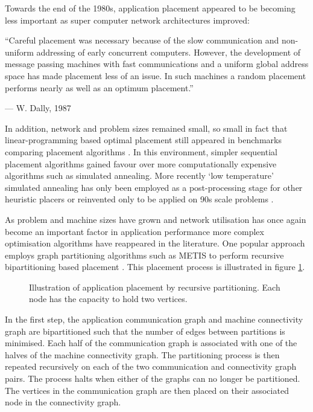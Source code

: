 				Towards the end of the 1980s, application placement appeared to be
				becoming less important as super computer network architectures
				improved:
				\begin{displayquote}
					``Careful placement was necessary because of the slow communication
					and non-uniform addressing of early concurrent computers. However,
					the development of message passing machines with fast communications
					and a uniform global address space  has made placement less of an
					issue. In such machines a random placement performs nearly as well as
					an optimum placement.''
					
					\noindent --- W. Dally, 1987 \cite{dally87}
				\end{displayquote}
				In addition, network and problem sizes remained small, so small in fact
				that linear-programming based optimal placement still appeared in
				benchmarks comparing placement algorithms \cite{xu91}. In this
				environment, simpler sequential placement algorithms gained favour over
				more computationally expensive algorithms such as simulated annealing.
				More recently `low temperature' simulated annealing has only been
				employed as a post-processing stage for other heuristic placers
				\cite{hoefler11} or reinvented only to be applied on 90s scale problems
				\cite{chen06}.
				
				As problem and machine sizes have grown and network utilisation has
				once again become an important factor in application performance
				\cite{navaridas09b} more complex optimisation algorithms have
				reappeared in the literature. One popular approach employs graph
				partitioning algorithms such as METIS \cite{karypis98} to perform
				recursive bipartitioning based placement
				\cite{phillips14,hoefler11,pellegrini96}.  This placement process is
				illustrated in figure \ref{fig:partitioning}.
				
				\begin{figure}
					\center
					
					\caption{Illustration of application placement by recursive
					partitioning. Each node has the capacity to hold two vertices.}
					\label{fig:partitioning}
				\end{figure}
				
				In the first step, the application communication graph and machine
				connectivity graph are bipartitioned such that the number of edges
				between partitions is minimised. Each half of the communication graph
				is associated with one of the halves of the machine connectivity graph.
				The partitioning process is then repeated recursively on each of the
				two communication and connectivity graph pairs. The process halts when
				either of the graphs can no longer be partitioned. The vertices in the
				communication graph are then placed on their associated node in the
				connectivity graph.
				
